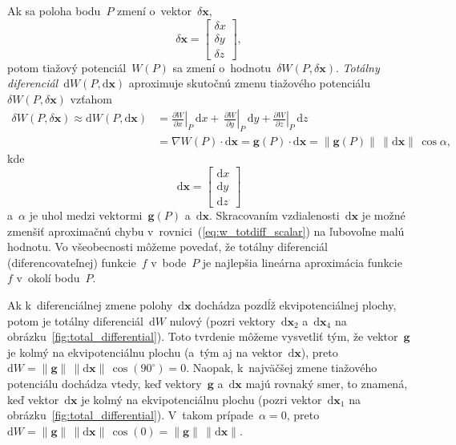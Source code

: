\documentclass[a4paper, 12pt]{book}
\newcommand{\diff}{\mathrm d}
\let\vec\mathbf
\begin{document}
Ak sa poloha bodu~$P$ zmení o~vektor~$\delta \vec x$,
%
\begin{equation}
\label{eq:deltax}
\delta \vec x =
\begin{bmatrix}
\delta x\\
\delta y\\
\delta z
\end{bmatrix}
{,}
\end{equation}
%
potom tiažový potenciál~$W(P)$ sa zmení o~hodnotu~$\delta W(P, \delta \vec x)$.  
\emph{Totálny diferenciál}~$\diff W(P, \diff \vec x)$ aproximuje skutočnú zmenu 
tiažového potenciálu~$\delta W(P, \delta \vec x)$ vzťahom
%
\begin{equation}
\label{eq:w_totdiff_scalar}
\begin{split}
\delta W(P, \delta \vec x) \approx \diff W(P, \diff \vec x) &= 
\left.\frac{\partial W}{\partial x}\right|_P \, \diff x + \, 
\left.\frac{\partial W}{\partial y}\right|_P \, \diff y + \left.\frac{\partial 
W}{\partial z}\right|_P \, \diff z\\
%
&= \nabla W(P) \cdot \diff \vec x = \vec g(P) \cdot \diff \vec x = \| \vec g(P) 
\| \, \| \diff \vec x \| \, \cos\alpha{,}
\end{split}
\end{equation}
%
kde
%
\begin{equation}
\label{eq:diffx}
\diff \vec x =
\begin{bmatrix}
\diff x\\
\diff y\\
\diff z
\end{bmatrix}
\end{equation}
%
a~$\alpha$ je uhol medzi vektormi~$\vec g(P)$ a~$\diff \vec x$.  Skracovaním 
vzdialenosti~$\diff \vec x$ je možné zmenšiť aproximačnú chybu 
v~rovnici~(\ref{eq:w_totdiff_scalar}) na ľubovoľne malú hodnotu.  Vo 
všeobecnosti môžeme povedať, že totálny diferenciál (diferencovateľnej) 
funkcie~$f$ v~bode~$P$ je najlepšia lineárna aproximácia funkcie~$f$ v~okolí 
bodu~$P$.

Ak k~diferenciálnej zmene polohy~$\diff \vec x$ dochádza pozdĺž 
ekvipotenciálnej plochy, potom je totálny diferenciál~$\diff W$ nulový (pozri 
vektory~$\diff \vec x_2$ a~$\diff \vec x_4$ na 
obrázku~\ref{fig:total_differential}).  Toto tvrdenie môžeme vysvetliť tým, že 
vektor~$\vec g$ je kolmý na ekvipotenciálnu plochu (a~tým aj na vektor~$\diff 
\vec x$), preto $\diff W = \| \vec g \| \, \| \diff \vec x \| \, 
\cos(90^{\circ}) = 0$.  Naopak, k~najväčšej zmene tiažového potenciálu dochádza 
vtedy, keď vektory~$\vec g$ a~$\diff \vec x$ majú rovnaký smer, to znamená, keď 
vektor~$\diff \vec x$ je kolmý na ekvipotenciálnu plochu (pozri vektor~$\diff 
\vec x_1$ na obrázku~\ref{fig:total_differential}).  V~takom prípade~$\alpha 
= 0$, preto $\diff W = \| \vec g \| \, \| \diff \vec x \| \, \cos(0) = \| \vec 
g \| \, \| \diff \vec x \|$.
\end{document}
